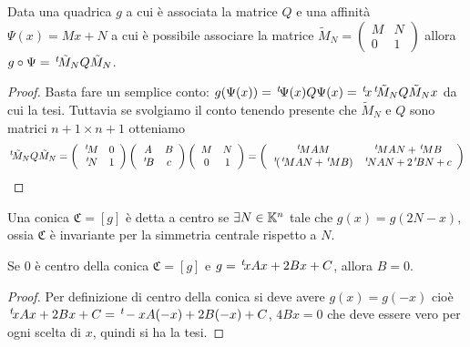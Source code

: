 \documentclass[a4paper,12pt]{article}
\begin{document}
\begin{lemma}\label{lem:cambioaffine}
	Data una quadrica $g$ a cui è associata la matrice $Q$ e una affinità $\Psi(x)=Mx+N$ a cui è possibile  associare la matrice
	$\tilde M_N = \left(\begin{smallmatrix}
M & N \\ 0 & 1
\end{smallmatrix}
\right)$ allora 
	$g\circ \Psi = \, ^{t}\!\tilde M_NQ \tilde M_N$.
\end{lemma}
\begin{proof}
	Basta fare un semplice conto: $g(\Psi(x))=\, ^{t}\!\Psi(x)Q \Psi(x) = \, ^{t}\!x\, ^{t}\!\tilde M_NQ \tilde M_N x$ da cui la tesi.
	Tuttavia se svolgiamo il conto tenendo presente che  $\tilde M_N$ e $Q$ sono matrici $n+1\times n+1$ otteniamo
	\[
		\tra{\tilde M_N}Q \tilde M_N = 
		\left(
			\begin{array}{cc}
			\tra{M} & 0\\
			\tra{N} & 1
			\end{array}
		\right)
		\left(
			\begin{array}{cc}
			A & B\\
			\tra{B} & c
			\end{array}
		\right)
		\left(
			\begin{array}{cc}
			M & N\\
			0 & 1
			\end{array}
		\right) =
		\left(
			\begin{array}{cc}
			\tra{M}AM & \tra{M}AN+\tra{M}B\\
			\tra{(\tra{M}AN+\tra{M}B)}& \tra{N}AN+2\tra{B}N+c
			\end{array}
		\right)
	\]

\end{proof}

\begin{definition}
	Una conica $\mathfrak{C}=[g]$ è detta a centro se $\exists N\in \mathbb K^n$ tale che $g(x)=g(2N-x)$, ossia $\mathfrak{C}$ è invariante per la
	simmetria centrale rispetto a $N$.
\end{definition}

\begin{lemma}\label{lem:centroconica}
	Se $0$ è centro della conica $\mathfrak{C}=[g]$ e $g=\, ^{t}\!xAx+2Bx+C$, allora $B=0$.
\end{lemma}

\begin{proof}
	Per definizione di centro della conica si deve avere  $g(x)=g(-x)$ cioè $\, ^{t}\!xAx+2Bx+C=\, ^{t}\!-xA(-x)+2B(-x)+C$, $4Bx=0$ che deve essere vero
	per ogni scelta di $x$, quindi si ha la tesi.
\end{proof}
\end{document}
